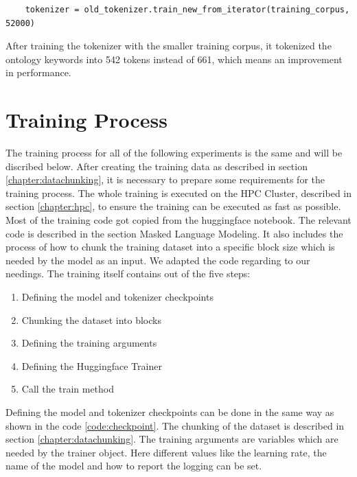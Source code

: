 \begin{code}
	\label{code:train_tokenizer}
\begin{verbatim}
	tokenizer = old_tokenizer.train_new_from_iterator(training_corpus, 52000)
\end{verbatim}
\end{code}
After training the tokenizer with the smaller training corpus, it tokenized the ontology keywords into 542 tokens instead of 661, which means an improvement in performance.

\section{Training Process}
\alert{The training process for all of the following experiments is the same and will be discribed below.}
After creating the training data as described in section \ref{chapter:datachunking}, it is necessary to prepare some requirements for the training process. The whole training is executed on the HPC Cluster, \alert{described in section \ref{chapter:hpc}}, \alert{to ensure the training can be executed as fast as possible}.
\alert{Most of the training code got copied from the huggingface notebook. The relevant code is described in the section Masked Language Modeling}. It also includes the process of how to chunk the training dataset into a specific block size which is needed by the model as an input. We adapted the code regarding to our needings. \newline
The training itself contains out of the five steps:
\begin{enumerate}
	\item Defining the model and tokenizer checkpoints
	\item Chunking the dataset into blocks
	\item Defining the training arguments
	\item Defining the Huggingface Trainer
	\item Call the train method
\end{enumerate}

Defining the model and tokenizer checkpoints can be done in the same way as shown in the code \ref{code:checkpoint}. The chunking of the dataset is described in section \ref{chapter:datachunking}. The training arguments are variables which are needed by the trainer object. Here different values like the learning rate, the name of the model and how to report the logging can be set.

